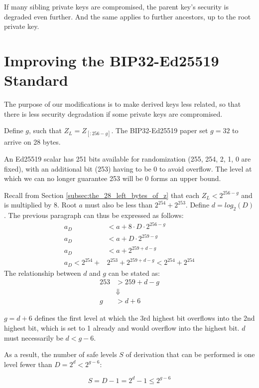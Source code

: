\documentclass[12pt, a4paper, twocolumn]{article}
\begin{document}
If many sibling private keys are compromised, the parent key's security is degraded even further. And the same applies to further ancestors, up to the root private key.

\section{Improving the BIP32-Ed25519 Standard}

The purpose of our modifications is to make derived keys less related, so that there is less security degradation if some private keys are compromised.

Define $g$, such that $Z_L = Z_{[:256-g]}$. The BIP32-Ed25519 paper\cite{BIP32-Ed25519} set $g=32$ to arrive on 28 bytes.

An Ed25519 scalar has 251 bits available for randomization (255, 254, 2, 1, 0 are fixed), with an additional bit (253) having to be 0 to avoid overflow. The level at which we can no longer guarantee 253 will be 0 forms an upper bound.

Recall from Section \ref{subsec:the_28_left_bytes_of_z} that each $Z_L < 2^{256 - g}$ and is multiplied by 8. Root $a$ must also be less than $2^{254} + 2^{253}$. Define $d = log_2(D)$. The previous paragraph can thus be expressed as follows:
\begin{align*}
  a_D &< a + 8\cdot D\cdot2^{256 - g} \\
  a_D &< a + D\cdot2^{259 - g} \\
  a_D &< a + 2^{259 + d - g}\\
  a_D < 2^{254} +& 2^{253} + 2^{259 + d - g} < 2^{254} + 2^{254}
\end{align*}
The relationship between $d$ and $g$ can be stated as:
\begin{align*}
  253 &> 259 + d - g \\
  &\Downarrow \\
  g &> d + 6
\end{align*}

 $g = d + 6$ defines the first level at which the 3rd highest bit overflows into the 2nd highest bit, which is set to 1 already and would overflow into the highest bit. $d$ must necessarily be $d < g - 6$.

 As a result, the number of safe levels $S$ of derivation that can be performed is one level fewer than $D = 2^{d} < 2^{g - 6}$:

 \begin{equation*}
  S = D - 1 = 2^{d} - 1 \leq 2^{g - 6}
  \end{equation*}
\end{document}
